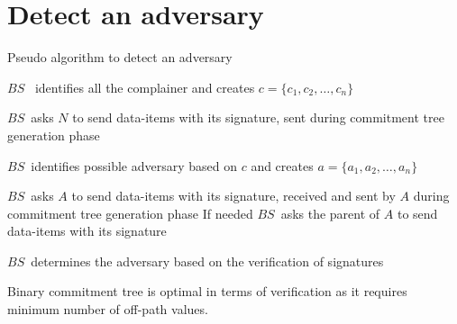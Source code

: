 \section{Detect an adversary}
\begin{algorithm}
\caption{Pseudo algorithm to detect an adversary}
\label{algo:detect-an-adversary}

	\begin{algorithmic}[1]

			\STATE $BS$ \ identifies all the complainer and creates $c = \{c_{1}, c_{2}, \dotsc, c_{n}\}$

				\STATE $BS$\ asks $N$ to send data-items with its signature, sent during commitment tree generation phase
			
			\ENDFOR

			\STATE $BS$\ identifies possible adversary based on $c$ and creates $a = \{a_{1},a_{2},\dotsc,a_{n}\}$


				\STATE $BS$\ asks $A$ to send data-items with its signature, received and sent by $A$ during commitment tree generation phase
				\STATE If needed $BS$\  asks the parent of $A$ to send data-items with its signature
	
			\ENDFOR

			\STATE $BS$\ determines the adversary based on the verification of signatures

	\end{algorithmic}
\end{algorithm}

\begin{theorem}
	\label{Commitment tree}
	Binary commitment tree is optimal in terms of verification as it requires minimum number of off-path values.
\end{theorem}

